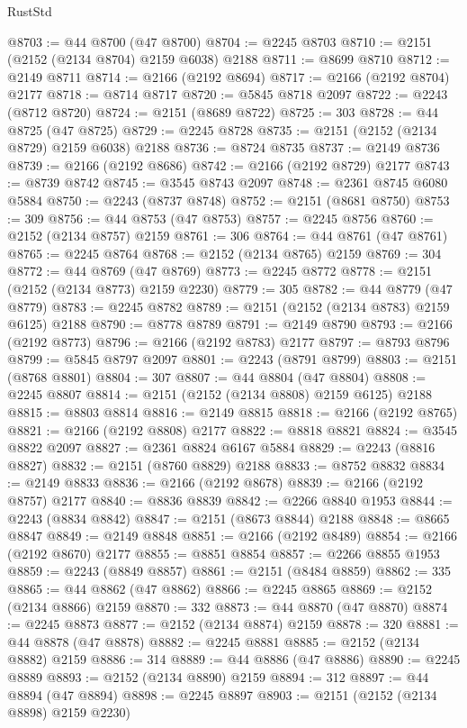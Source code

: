 \begin{lexlean}{RustStd}
\begin{coremodule}
@8703 := @44 @8700 (@47 @8700)
@8704 := @2245 @8703
@8710 := @2151 (@2152 (@2134 @8704) @2159 @6038) @2188
@8711 := @8699 @8710
@8712 := @2149 @8711
@8714 := @2166 (@2192 @8694)
@8717 := @2166 (@2192 @8704) @2177
@8718 := @8714 @8717
@8720 := @5845 @8718 @2097
@8722 := @2243 (@8712 @8720)
@8724 := @2151 (@8689 @8722)
@8725 := 303
@8728 := @44 @8725 (@47 @8725)
@8729 := @2245 @8728
@8735 := @2151 (@2152 (@2134 @8729) @2159 @6038) @2188
@8736 := @8724 @8735
@8737 := @2149 @8736
@8739 := @2166 (@2192 @8686)
@8742 := @2166 (@2192 @8729) @2177
@8743 := @8739 @8742
@8745 := @3545 @8743 @2097
@8748 := @2361 @8745 @6080 @5884
@8750 := @2243 (@8737 @8748)
@8752 := @2151 (@8681 @8750)
@8753 := 309
@8756 := @44 @8753 (@47 @8753)
@8757 := @2245 @8756
@8760 := @2152 (@2134 @8757) @2159
@8761 := 306
@8764 := @44 @8761 (@47 @8761)
@8765 := @2245 @8764
@8768 := @2152 (@2134 @8765) @2159
@8769 := 304
@8772 := @44 @8769 (@47 @8769)
@8773 := @2245 @8772
@8778 := @2151 (@2152 (@2134 @8773) @2159 @2230)
@8779 := 305
@8782 := @44 @8779 (@47 @8779)
@8783 := @2245 @8782
@8789 := @2151 (@2152 (@2134 @8783) @2159 @6125) @2188
@8790 := @8778 @8789
@8791 := @2149 @8790
@8793 := @2166 (@2192 @8773)
@8796 := @2166 (@2192 @8783) @2177
@8797 := @8793 @8796
@8799 := @5845 @8797 @2097
@8801 := @2243 (@8791 @8799)
@8803 := @2151 (@8768 @8801)
@8804 := 307
@8807 := @44 @8804 (@47 @8804)
@8808 := @2245 @8807
@8814 := @2151 (@2152 (@2134 @8808) @2159 @6125) @2188
@8815 := @8803 @8814
@8816 := @2149 @8815
@8818 := @2166 (@2192 @8765)
@8821 := @2166 (@2192 @8808) @2177
@8822 := @8818 @8821
@8824 := @3545 @8822 @2097
@8827 := @2361 @8824 @6167 @5884
@8829 := @2243 (@8816 @8827)
@8832 := @2151 (@8760 @8829) @2188
@8833 := @8752 @8832
@8834 := @2149 @8833
@8836 := @2166 (@2192 @8678)
@8839 := @2166 (@2192 @8757) @2177
@8840 := @8836 @8839
@8842 := @2266 @8840 @1953
@8844 := @2243 (@8834 @8842)
@8847 := @2151 (@8673 @8844) @2188
@8848 := @8665 @8847
@8849 := @2149 @8848
@8851 := @2166 (@2192 @8489)
@8854 := @2166 (@2192 @8670) @2177
@8855 := @8851 @8854
@8857 := @2266 @8855 @1953
@8859 := @2243 (@8849 @8857)
@8861 := @2151 (@8484 @8859)
@8862 := 335
@8865 := @44 @8862 (@47 @8862)
@8866 := @2245 @8865
@8869 := @2152 (@2134 @8866) @2159
@8870 := 332
@8873 := @44 @8870 (@47 @8870)
@8874 := @2245 @8873
@8877 := @2152 (@2134 @8874) @2159
@8878 := 320
@8881 := @44 @8878 (@47 @8878)
@8882 := @2245 @8881
@8885 := @2152 (@2134 @8882) @2159
@8886 := 314
@8889 := @44 @8886 (@47 @8886)
@8890 := @2245 @8889
@8893 := @2152 (@2134 @8890) @2159
@8894 := 312
@8897 := @44 @8894 (@47 @8894)
@8898 := @2245 @8897
@8903 := @2151 (@2152 (@2134 @8898) @2159 @2230)

\end{coremodule}
\end{lexlean}
